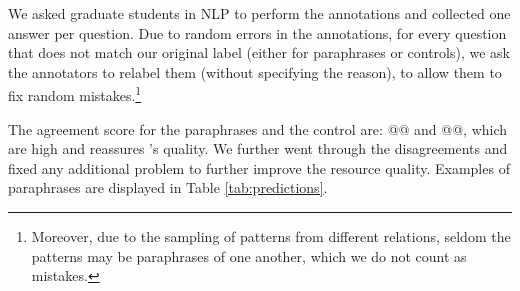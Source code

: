 We asked graduate students in NLP to perform the annotations and collected one answer per question.
Due to random errors in the annotations, for every question that does not match our original label (either for paraphrases or controls), we ask the annotators to relabel them (without specifying the reason), to allow them to fix random mistakes.\footnote{Moreover, due to the sampling of patterns from different relations, seldom the patterns may be paraphrases of one another, which we do not count as mistakes.}

The agreement score for the paraphrases and the control are: @@ and @@, which are high and reassures \resource's quality.
We further went through the disagreements  %
and fixed any additional problem %
to further improve the resource quality.
Examples of paraphrases are displayed in Table \ref{tab:predictions}. 
% 

